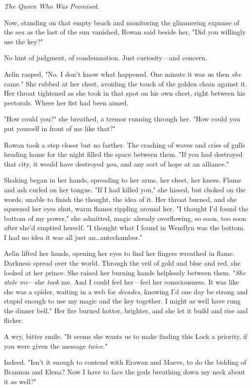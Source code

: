 \emph{The Queen Who Was Promised}.

Now, standing on that empty beach and monitoring the glimmering expanse of the sea as the last of the sun vanished, Rowan said beside her, "Did you willingly use the key?"

No hint of judgment, of condemnation.
Just curiosity---and concern.

Aelin rasped, "No.
I don't know what happened.
One minute it was us  then \emph{she} came."
She rubbed at her chest, avoiding the touch of the golden chain against it.
Her throat tightened as she took in that spot on his own chest, right between his pectorals.
Where her fist had been aimed.

"How could you?"
she breathed, a tremor running through her.
"How could you put yourself in front of me like that?"

Rowan took a step closer but no farther.
The crashing of waves and cries of gulls heading home for the night filled the space between them.
"If you had destroyed that city, it would have destroyed \emph{you}, and any sort of hope at an alliance."

Shaking began in her hands, spreading to her arms, her chest, her knees.
Flame and ash curled on her tongue.
"If I had killed you," she hissed, but choked on the words, unable to finish the thought, the idea of it.
Her throat burned, and she squeezed her eyes shut, warm flames rippling around her.
"I thought I'd found the bottom of my power," she admitted, magic already overflowing, so soon, too soon after she'd emptied herself.
"I thought what I found in Wendlyn was the bottom.
I had no idea it was all just an\ldots antechamber."

Aelin lifted her hands, opening her eyes to find her fingers wreathed in flame.
Darkness spread over the world.
Through the veil of gold and blue and red, she looked at her prince.
She raised her burning hands helplessly between them.
"\emph{She stole me}---she \emph{took} me.
And I could feel her---feel her consciousness.
It was like she was a spider, waiting in a web for \emph{decades}, knowing I'd one day be strong and stupid enough to use my magic and the key together.
I might as well have rung the dinner bell."
Her fire burned hotter, brighter, and she let it build and rise and flicker.

A wry, bitter smile.
"It seems she wants us to make finding this Lock a priority, if you were given the message \emph{twice.}"

Indeed.
"Isn't it enough to contend with Erawan and Maeve, to do the bidding of Brannon and Elena?
Now I have to face the gods breathing down my neck about it as well?"

